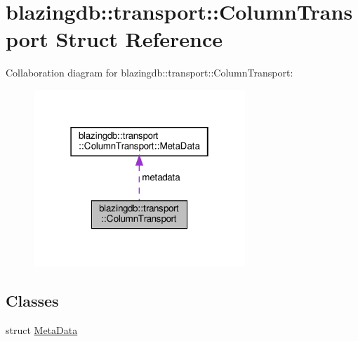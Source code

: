 \hypertarget{structblazingdb_1_1transport_1_1ColumnTransport}{}\section{blazingdb\+:\+:transport\+:\+:Column\+Transport Struct Reference}
\label{structblazingdb_1_1transport_1_1ColumnTransport}


Collaboration diagram for blazingdb\+:\+:transport\+:\+:Column\+Transport\+:\nopagebreak
\begin{figure}[H]
\begin{center}
\leavevmode
\includegraphics[width=226pt]{structblazingdb_1_1transport_1_1ColumnTransport__coll__graph}
\end{center}
\end{figure}
\subsection*{Classes}
\begin{DoxyCompactItemize}
\item 
struct \hyperlink{structblazingdb_1_1transport_1_1ColumnTransport_1_1MetaData}{Meta\+Data}
\end{DoxyCompactItemize}

